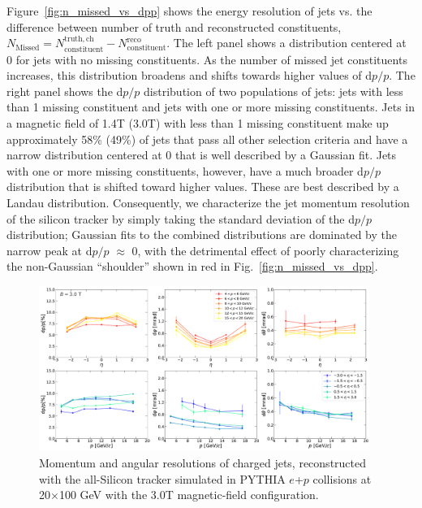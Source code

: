 Figure~\ref{fig:n_missed_vs_dpp} shows the energy resolution of jets vs. the difference between number of truth and reconstructed constituents, $N_\mathrm{Missed} = N_\mathrm{constituent}^\mathrm{truth,ch} - N_\mathrm{constituent}^\mathrm{reco}$. 
The left panel shows a distribution centered at 0 for jets with no missing constituents. As the number of missed jet constituents increases, this distribution broadens and shifts towards higher values of d$p/p$. The right panel shows the d$p/p$ distribution of two populations of jets: jets with less than 1 missing constituent and jets with one or more missing constituents. Jets in a magnetic field of 1.4T (3.0T) with less than 1 missing constituent make up approximately 58\% (49\%) of jets that pass all other selection criteria and have a narrow distribution centered at 0 that is well described by a Gaussian fit. Jets with one or more missing constituents, however, have a much broader d$p/p$ distribution that is shifted toward higher values. These are best described by a Landau distribution. Consequently, we characterize the jet momentum resolution of the silicon tracker by simply taking the standard deviation of the d$p/p$ distribution; 
Gaussian fits to the combined distributions are dominated by the narrow peak at d$p/p$ $\approx$ 0, with the detrimental effect of poorly characterizing the non-Gaussian ``shoulder'' shown in red in Fig.~\ref{fig:n_missed_vs_dpp}.


\begin{figure}[htbp]
    \centering
    \includegraphics[width=0.96\textwidth]{EIC_Jets/DeltaR_B_3.0_resolutions_eta_mom.pdf}
    \caption{Momentum and angular resolutions of charged jets, reconstructed with the all-Silicon tracker simulated in PYTHIA $e$+$p$ collisions at 20$\times$100 GeV with the 3.0T magnetic-field configuration.}
    \label{fig:3T_jet_resolutions}
\end{figure}


